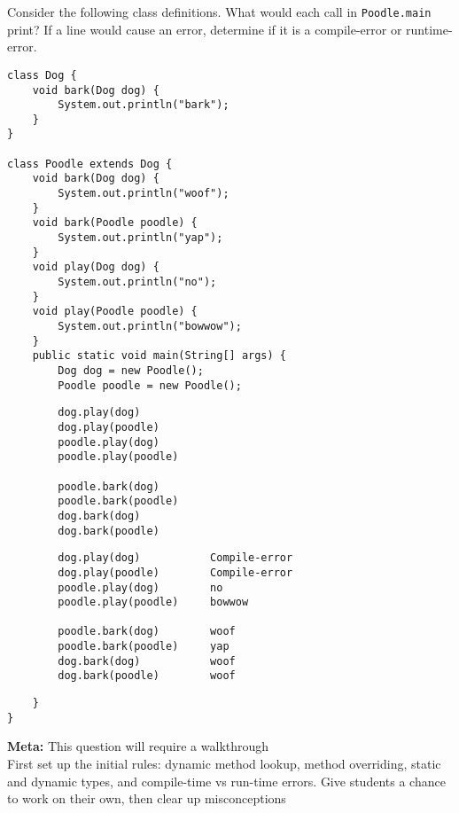 \begin{blocksection}
\question Consider the following class definitions. What would each call in \lstinline$Poodle.main$ print? If a line would cause an error, determine if it is a compile-error or runtime-error.

\begin{lstlisting}
class Dog {
    void bark(Dog dog) {
        System.out.println("bark");
    }
}

class Poodle extends Dog {
    void bark(Dog dog) {
        System.out.println("woof");
    }
    void bark(Poodle poodle) {
        System.out.println("yap");
    }
    void play(Dog dog) {
        System.out.println("no");
    }
    void play(Poodle poodle) {
        System.out.println("bowwow");
    }
    public static void main(String[] args) {
        Dog dog = new Poodle();
        Poodle poodle = new Poodle();
\end{lstlisting}

\ifprintanswers\else
\begin{lstlisting}
        dog.play(dog)
        dog.play(poodle)
        poodle.play(dog)
        poodle.play(poodle)

        poodle.bark(dog)
        poodle.bark(poodle)
        dog.bark(dog)
        dog.bark(poodle)
\end{lstlisting}
\fi

\begin{solution}
\begin{lstlisting}
        dog.play(dog)           Compile-error
        dog.play(poodle)        Compile-error
        poodle.play(dog)        no
        poodle.play(poodle)     bowwow

        poodle.bark(dog)        woof
        poodle.bark(poodle)     yap
        dog.bark(dog)           woof
        dog.bark(poodle)        woof
\end{lstlisting}
\end{solution}

\begin{lstlisting}
    }
}
\end{lstlisting}
\begin{solution}
\textbf{Meta:} This question will require a walkthrough \\
First set up the initial rules: dynamic method lookup, method overriding,
static and dynamic types, and compile-time vs run-time errors.
Give students a chance to work on their own, then clear up misconceptions
\end{solution}
\end{blocksection}
